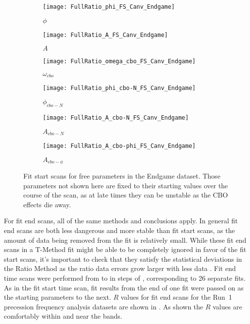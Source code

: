 \begin{figure}
\centering
    \begin{subfigure}[]{0.45\textwidth}
        \centering
        \texttt{[image: FullRatio\_phi\_FS\_Canv\_Endgame]}
        \caption{$\phi$}
    \end{subfigure}%
    \begin{subfigure}[]{0.45\textwidth}
        \centering
        \texttt{[image: FullRatio\_A\_FS\_Canv\_Endgame]}
        \caption{$A$}
    \end{subfigure}

    \begin{subfigure}[]{0.45\textwidth}
        \centering
        \texttt{[image: FullRatio\_omega\_cbo\_FS\_Canv\_Endgame]}
        \caption{$\omega_{cbo}$}
    \end{subfigure}%
    \begin{subfigure}[]{0.45\textwidth}
        \centering
        \texttt{[image: FullRatio\_phi\_cbo-N\_FS\_Canv\_Endgame]}
        \caption{$\phi_{cbo-N}$}
    \end{subfigure}

    \begin{subfigure}[]{0.45\textwidth}
        \centering
        \texttt{[image: FullRatio\_A\_cbo-N\_FS\_Canv\_Endgame]}
        \caption{$A_{cbo-N}$}
    \end{subfigure}%
    \begin{subfigure}[]{0.45\textwidth}
        \centering
        \texttt{[image: FullRatio\_A\_cbo-phi\_FS\_Canv\_Endgame]}
        \caption{$A_{cbo-\phi}$}
    \end{subfigure}
\caption[Fit start scans for free parameters in the Endgame dataset]{Fit start scans for free parameters in the Endgame dataset. Those parameters not shown here are fixed to their starting values over the course of the scan, as at late times they can be unstable as the CBO effects die away.}
\label{fig:fitStartScan_EndgamePars}
\end{figure}


For fit end scans, all of the same methods and conclusions apply. In general fit end scans are both less dangerous and more stable than fit start scans, as the amount of data being removed from the fit is relatively small. While these fit end scans in a T-Method fit might be able to be completely ignored in favor of the fit start scans, it's important to check that they satisfy the statistical deviations in the Ratio Method as the ratio data errors grow larger with less data \cite{BU60hReport}. Fit end time scans were performed from  to  in steps of , corresponding to 26 separate fits. As in the fit start time scan, fit results from the end of one fit were passed on as the starting parameters to the next. $R$ values for fit end scans for the Run~1 precession frequency analysis datasets are shown in . As shown the $R$ values are comfortably within and near the bands.


